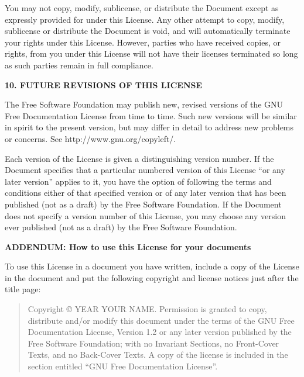 \documentclass[a4paper,spanish,12pt]{book}
\begin{document}
You may not copy, modify, sublicense, or distribute the Document except
as expressly provided for under this License.  Any other attempt to
copy, modify, sublicense or distribute the Document is void, and will
automatically terminate your rights under this License.  However,
parties who have received copies, or rights, from you under this
License will not have their licenses terminated so long as such
parties remain in full compliance.


\begin{center}
{\Large\bf 10. FUTURE REVISIONS OF THIS LICENSE\par}
\end{center}


The Free Software Foundation may publish new, revised versions
of the GNU Free Documentation License from time to time.  Such new
versions will be similar in spirit to the present version, but may
differ in detail to address new problems or concerns.  See
http://www.gnu.org/copyleft/.

Each version of the License is given a distinguishing version number.
If the Document specifies that a particular numbered version of this
License ``or any later version'' applies to it, you have the option of
following the terms and conditions either of that specified version or
of any later version that has been published (not as a draft) by the
Free Software Foundation.  If the Document does not specify a version
number of this License, you may choose any version ever published (not
as a draft) by the Free Software Foundation.


\begin{center}
{\Large\bf ADDENDUM: How to use this License for your documents\par}
\end{center}

To use this License in a document you have written, include a copy of
the License in the document and put the following copyright and
license notices just after the title page:

\bigskip
\begin{quote}
    Copyright \copyright{}  YEAR  YOUR NAME.
    Permission is granted to copy, distribute and/or modify this document
    under the terms of the GNU Free Documentation License, Version 1.2
    or any later version published by the Free Software Foundation;
    with no Invariant Sections, no Front-Cover Texts, and no Back-Cover Texts.
    A copy of the license is included in the section entitled ``GNU
    Free Documentation License''.
\end{quote}
\bigskip
    
\end{document}
